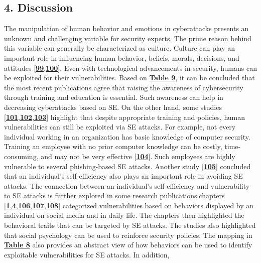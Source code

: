 {\subsection{\textbf{4. Discussion}}

The manipulation of human behavior and emotions in cyberattacks presents an unknown and challenging variable for security experts. The prime reason behind this variable can generally be characterized as culture. Culture can play an important role in influencing human behavior, beliefs, morals, decisions, and attitudes [\href{https://www.mdpi.com/2076-3417/12/12/6042\#B99-applsci-12-06042}{\textbf{99}},\href{https://www.mdpi.com/2076-3417/12/12/6042\#B100-applsci-12-06042}{\textbf{100}}]. Even with technological advancements in security, humans can be exploited for their vulnerabilities. Based on \href{https://www.mdpi.com/2076-3417/12/12/6042\#table_body_display_applsci-12-06042-t009}{\textbf{Table 9}}, it can be concluded that the most recent publications agree that raising the awareness of cybersecurity through training and education is essential. Such awareness can help in decreasing cyberattacks based on SE. On the other hand, some studies [\href{https://www.mdpi.com/2076-3417/12/12/6042\#B101-applsci-12-06042}{\textbf{101}},\href{https://www.mdpi.com/2076-3417/12/12/6042\#B102-applsci-12-06042}{\textbf{102}},\href{https://www.mdpi.com/2076-3417/12/12/6042\#B103-applsci-12-06042}{\textbf{103}}] highlight that despite appropriate training and policies, human vulnerabilities can still be exploited via SE attacks. For example, not every individual working in an organization has basic knowledge of computer security. Training an employee with no prior computer knowledge can be costly, time-consuming, and may not be very effective [\href{https://www.mdpi.com/2076-3417/12/12/6042\#B104-applsci-12-06042}{\textbf{104}}]. Such employees are highly vulnerable to several phishing-based SE attacks. Another study [\href{https://www.mdpi.com/2076-3417/12/12/6042\#B105-applsci-12-06042}{\textbf{105}}] concluded that an individual’s self-efficiency also plays an important role in avoiding SE attacks. The connection between an individual’s self-efficiency and vulnerability to SE attacks is further explored in some research publications.chapters [\href{https://www.mdpi.com/2076-3417/12/12/6042\#B1-applsci-12-06042}{\textbf{1}},\href{https://www.mdpi.com/2076-3417/12/12/6042\#B4-applsci-12-06042}{\textbf{4}},\href{https://www.mdpi.com/2076-3417/12/12/6042\#B106-applsci-12-06042}{\textbf{106}},\href{https://www.mdpi.com/2076-3417/12/12/6042\#B107-applsci-12-06042}{\textbf{107}},\href{https://www.mdpi.com/2076-3417/12/12/6042\#B108-applsci-12-06042}{\textbf{108}}] categorized vulnerabilities based on behaviors displayed by an individual on social media and in daily life. The chapters then highlighted the behavioral traits that can be targeted by SE attacks. The studies also highlighted that social psychology can be used to reinforce security policies. The mapping in \href{https://www.mdpi.com/2076-3417/12/12/6042\#table_body_display_applsci-12-06042-t008}{\textbf{Table 8}} also provides an abstract view of how behaviors can be used to identify exploitable vulnerabilities for SE attacks. In addition, }
